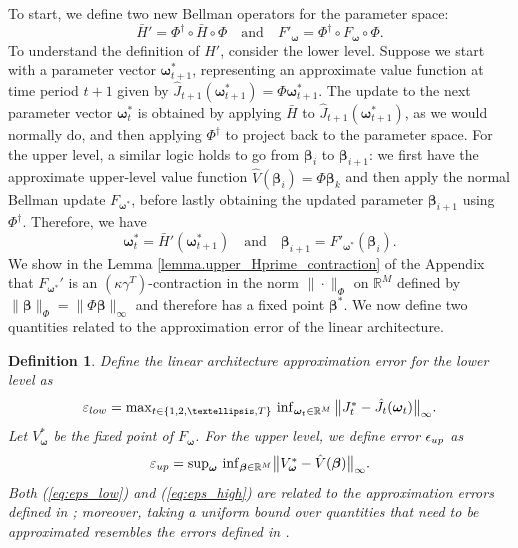 \documentclass[11pt, notitlepage]{article}
\newcommand{\R}{\mathbb{R}}
\newcommand{\1}{\mathbbm{1}}
\newtheorem{definition}{Definition}
\begin{document}
To start, we define two new Bellman operators for the parameter space:
\begin{equation*}
    \bar{H}' = \Phi^{\dagger} \circ \bar{H} \circ \Phi \quad \text{and} \quad F'_{\boldsymbol{\omega}} = \Phi^{\dagger} \circ F_{\boldsymbol{\omega}} \circ \Phi.
\end{equation*}
To understand the definition of $H'$, consider the lower level. Suppose we start with a parameter vector $\boldsymbol{\omega}_{t+1}^*$, representing an approximate value function at time period $t+1$ given by $\hat{J}_{t+1}(\boldsymbol{\omega}_{t+1}^*) = \Phi \boldsymbol{\omega}_{t+1}^*$. The update to the next parameter vector $\boldsymbol{\omega}_t^*$ is obtained by applying $\bar{H}$ to $\hat{J}_{t+1}(\boldsymbol{\omega}_{t+1}^*)$, as we would normally do, and then applying $\Phi^{\dagger}$ to project back to the parameter space. For the upper level, a similar logic holds to go from $\boldsymbol{\beta}_i$ to $\boldsymbol{\beta}_{i+1}$: we first have the approximate upper-level value function $\hat{V}(\boldsymbol{\beta}_{i}) = \Phi \boldsymbol{\beta}_k$ and then apply the normal Bellman update $F_{\boldsymbol{\omega}^*}$, before lastly obtaining the updated parameter $\boldsymbol{\beta}_{i+1}$ using $\Phi^{\dagger}$. Therefore, we have 
\begin{equation*}
\boldsymbol{\omega}_t^* = \bar{H}' (\boldsymbol{\omega}_{t+1}^*) \quad \text{and} \quad \boldsymbol{\beta}_{i+1} = F'_{\boldsymbol{\omega}^*} (\boldsymbol{\beta}_{i}).
\end{equation*}
We show in the Lemma \ref{lemma.upper_Hprime_contraction} of the Appendix that $F_{\boldsymbol{\omega}^*}'$ is an $(\kappa \gamma^{T})$-contraction in the norm $\|\cdot\|_\Phi$ on $\R^M$ defined by $\|\boldsymbol{\beta}\|_\Phi = \| \Phi \boldsymbol{\beta} \|_\infty$ and therefore has a fixed point $\boldsymbol{\beta}^*$. We now define two quantities related to the approximation error of the linear architecture.
\begin{definition}

Define the linear architecture approximation error for the lower level as
\begin{equation}
    \varepsilon_{\textnormal{low}} = \textstyle \max_{t \in \{1, 2, \ldots, T\}} \, \inf_{\boldsymbol{\omega}_t \in \mathbb R^M} \, \bigl \| J^*_t - \hat{J}_t(\boldsymbol{\omega}_t) \bigr \|_\infty.
    \label{eq:eps_low}
\end{equation}
Let $V^*_{\boldsymbol{\omega}}$ be the fixed point of $F_{\boldsymbol{\omega}}$. For the upper level, we define error $\epsilon_{\textnormal{up}}$ as
\begin{equation}
    \varepsilon_{\textnormal{up}} = \textstyle \sup_{\boldsymbol{\omega}} \, \inf_{\boldsymbol{\beta} \in \mathbb{R}^M} \bigl \| V^*_{\boldsymbol{\omega}} - \hat{V}(\boldsymbol{\beta}) \bigr \|_\infty.
    \label{eq:eps_high}
\end{equation}
Both (\ref{eq:eps_low}) and (\ref{eq:eps_high}) are related to the approximation errors defined in \cite{tsitsiklis1996feature}; moreover, taking a uniform bound over quantities that need to be approximated resembles the errors defined in \cite{munos2008finite}.
\end{definition}
\end{document}
